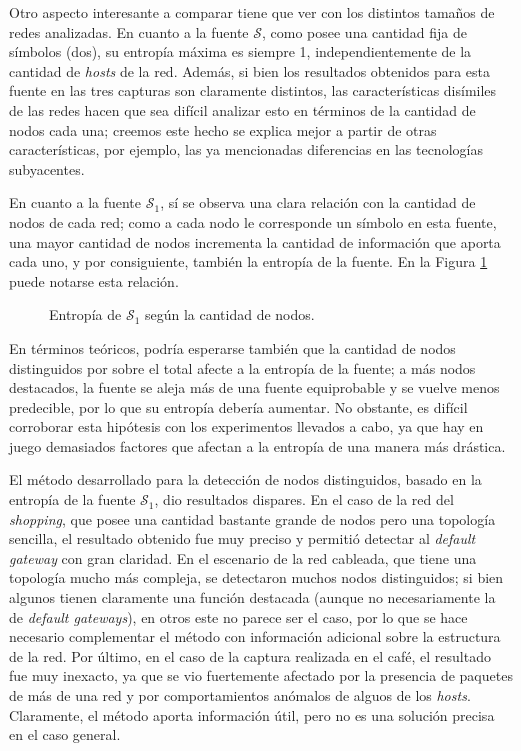 Otro aspecto interesante a comparar tiene que ver con los distintos tamaños de
redes analizadas. En cuanto a la fuente $\mathcal{S}$, como posee una cantidad
fija de símbolos (dos), su entropía máxima es siempre 1, independientemente de
la cantidad de \emph{hosts} de la red. Además, si bien los resultados obtenidos
para esta fuente en las tres capturas son claramente distintos, las
características disímiles de las redes hacen que sea difícil analizar esto en
términos de la cantidad de nodos cada una; creemos este hecho se explica mejor
a partir de otras características, por ejemplo, las ya mencionadas diferencias
en las tecnologías subyacentes.

En cuanto a la fuente $\mathcal{S}_1$, sí se observa una clara relación
con la cantidad de nodos de cada red; como a cada nodo le corresponde un
símbolo en esta fuente, una mayor cantidad de nodos incrementa
la cantidad de información que aporta cada uno, y por consiguiente, también la
entropía de la fuente. En la Figura \ref{general:entropy_vs_nodes} puede
notarse esta relación.

\begin{figure}[H]
    \caption{Entropía de $\mathcal{S}_1$ según la cantidad de nodos.}
    \label{general:entropy_vs_nodes}
\end{figure}

En términos teóricos, podría esperarse también que la cantidad de nodos
distinguidos por sobre el total afecte a la entropía de la fuente; a más nodos
destacados, la fuente se aleja más de una fuente equiprobable y se vuelve
menos predecible, por lo que su entropía debería aumentar. No obstante, es
difícil corroborar esta hipótesis con los experimentos llevados a cabo, ya que
hay en juego demasiados factores que afectan a la entropía de una manera más
drástica.


El método desarrollado para la detección de nodos distinguidos, basado en la
entropía de la fuente $\mathcal{S}_1$, dio resultados dispares. En el caso de
la red del \emph{shopping}, que posee una cantidad bastante grande de nodos
pero una topología sencilla, el resultado obtenido fue muy preciso y permitió
detectar al \emph{default gateway} con gran claridad. En el escenario de la
red cableada, que tiene una topología mucho más compleja, se detectaron muchos
nodos distinguidos; si bien algunos tienen claramente una función destacada
(aunque no necesariamente la de \emph{default gateways}), en otros este no
parece ser el caso, por lo que se hace necesario complementar el método con
información adicional sobre la estructura de la red. Por último, en el caso de
la captura realizada en el café, el resultado fue muy inexacto, ya que se vio
fuertemente afectado por la presencia de paquetes de más de una red y por
comportamientos anómalos de alguos de los \emph{hosts}. Claramente, el método
aporta información útil, pero no es una solución precisa en el caso general.
